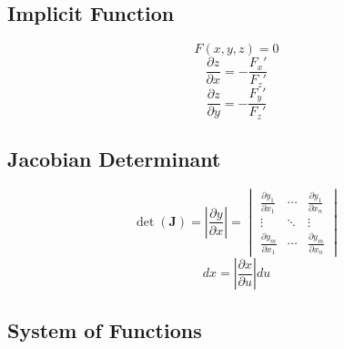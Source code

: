 \documentclass{article}
\begin{document}
\subsection{Implicit Function}

\[
    F(x, y, z) = 0
\]
\[
    \frac{\partial z}{\partial x} = -\frac{F_x'}{F_z'}
\]
\[
    \frac{\partial z}{\partial y} = -\frac{F_y'}{F_z'}
\]

\subsection{Jacobian Determinant}

\[
    \det(\mathbf{J}) = \left|\frac{\partial y}{\partial x}\right| = \begin{vmatrix}
        \frac{\partial y_1}{\partial x_1} & \cdots & \frac{\partial y_1}{\partial x_n} \\
        \vdots & \ddots & \vdots \\
        \frac{\partial y_m}{\partial x_1} & \cdots & \frac{\partial y_m}{\partial x_n}
    \end{vmatrix}
\]
\[
    dx = \left|\frac{\partial x}{\partial u}\right| du
\]

\subsection{System of Functions}
\end{document}
